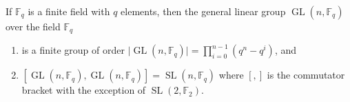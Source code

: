 \documentclass[12pt]{article}
\begin{document}
If $\mathbb{F}_q$ is a finite field with $q$ elements, then the general linear group $\operatorname{GL}(n, \mathbb{F}_q)$ over the field $\mathbb{F}_q$

\begin{enumerate}
\item is a finite group of order $\lvert \operatorname{GL}(n, \mathbb{F}_q) \rvert = \prod_{i=0}^{n-1}(q^n-q^i)$, and
\item $[\operatorname{GL}(n,\mathbb{F}_q),\operatorname{GL}(n,\mathbb{F}_q)] = \operatorname{SL}(n,\mathbb{F}_q)$ where $[,]$ is the commutator bracket with the exception of $\operatorname{SL}(2,\mathbb{F}_2)$.
\end{enumerate}
\end{document}
